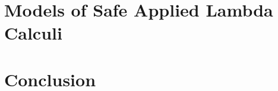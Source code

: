 \documentclass[a4paper,twoside,openright,draft]{ociamthesis}
\begin{document}
\chapter{Models of Safe Applied Lambda Calculi}
    \label{chap:model}
    
\ifdraftmode\else

\chapter{Conclusion}
    \label{chap:conclusion}
    



\fi

\pdfsyncstop

\cleardoublepage
{}
{}
  
  

  \cleardoublepage
  \printnotations

  \clearpage
  \printindex

\pdfsyncstart
\end{document}
